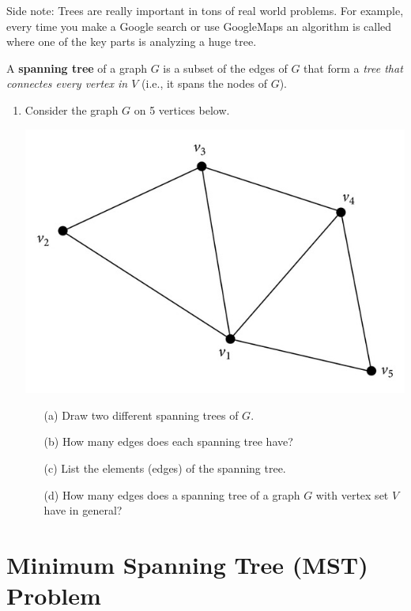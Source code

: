 \documentclass[11pt]{article}
\theoremstyle{definition}
\newcommand{\answerbox}[3]{%
  \fbox{%
    \begin{minipage}[#1]{#2}
      \hfill\vspace{#3}
    \end{minipage}
  }
}
\newcommand{\letterbox}{\answerbox{c}{.7cm}{.7cm}}
\begin{document}
\vfill

Side note: Trees are really important in tons of real world problems. For example, every time you make a Google search or use GoogleMaps an algorithm is called where one of the key parts is analyzing a huge tree. \vspace{1cm}


\newpage
\begin{tcolorbox}
A \textbf{spanning tree} of a graph $G$ is a  subset of the edges of $G$ that form a 
\emph{tree that connectes every vertex in $V$} (i.e., it spans the nodes of $G$).
\end{tcolorbox}


\begin{enumerate}[resume]
\item Consider the graph $G$ on 5 vertices below.  

\begin{center}
\includegraphics[width=.4\textwidth]{graph5}
\end{center}

\begin{itemize}
\item[(a)] Draw two different spanning trees of $G$.

\vspace{2.5in}

\item[(b)] How many edges does each spanning tree have?  \letterbox
\item[(c)] List the elements (edges) of the spanning tree. 

\vspace{1in}
\item[(d)] How many edges does a spanning tree of a graph $G$ with vertex set $V$ have in general?

\end{itemize}
\end{enumerate}

\newpage
\section{Minimum Spanning Tree (MST) Problem}
\end{document}
